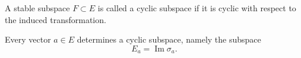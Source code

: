 A stable subspace $F \subset E$ is called a cyclic subspace if it is cyclic with respect to the induced transformation.

Every vector $a \in E$ determines a cyclic subspace, namely the subspace
$$E_a = \operatorname{Im} \sigma_a.$$
